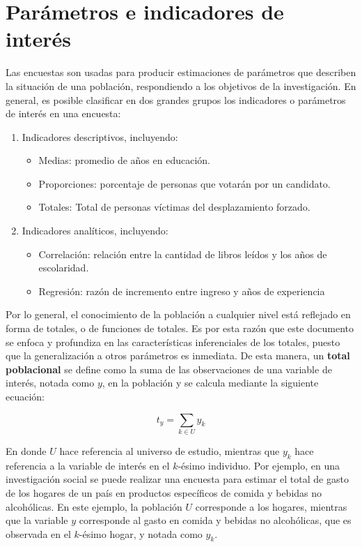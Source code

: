 \documentclass[
  12pt,
  spanish,
]{book}
\providecommand{\tightlist}{%
  \setlength{\itemsep}{0pt}\setlength{\parskip}{0pt}}
\begin{document}
\hypertarget{paruxe1metros-e-indicadores-de-interuxe9s}{%
\section{Parámetros e indicadores de interés}\label{paruxe1metros-e-indicadores-de-interuxe9s}}

Las encuestas son usadas para producir estimaciones de parámetros que describen la situación de una población, respondiendo a los objetivos de la investigación. En general, es posible clasificar en dos grandes grupos los indicadores o parámetros de interés en una encuesta:

\begin{enumerate}
\def\labelenumi{\arabic{enumi}.}
\tightlist
\item
  Indicadores descriptivos, incluyendo:

  \begin{itemize}
  \tightlist
  \item
    Medias: promedio de años en educación.
  \item
    Proporciones: porcentaje de personas que votarán por un candidato.
  \item
    Totales: Total de personas víctimas del desplazamiento forzado.
  \end{itemize}
\item
  Indicadores analíticos, incluyendo:

  \begin{itemize}
  \tightlist
  \item
    Correlación: relación entre la cantidad de libros leídos y los años de escolaridad.
  \item
    Regresión: razón de incremento entre ingreso y años de experiencia
  \end{itemize}
\end{enumerate}

Por lo general, el conocimiento de la población a cualquier nivel está reflejado en forma de totales, o de funciones de totales. Es por esta razón que este documento se enfoca y profundiza en las características inferenciales de los totales, puesto que la generalización a otros parámetros es inmediata. De esta manera, un \textbf{total poblacional} se define como la suma de las observaciones de una variable de interés, notada como \(y\), en la población y se calcula mediante la siguiente ecuación:

\[t_y = \sum_{k \in U} y_k\]

En donde \(U\) hace referencia al universo de estudio, mientras que \(y_k\) hace referencia a la variable de interés en el \(k\)-ésimo individuo. Por ejemplo, en una investigación social se puede realizar una encuesta para estimar el total de gasto de los hogares de un país en productos específicos de comida y bebidas no alcohólicas. En este ejemplo, la población \(U\) corresponde a los hogares, mientras que la variable \(y\) corresponde al gasto en comida y bebidas no alcohólicas, que es observada en el \(k\)-ésimo hogar, y notada como \(y_k\).
\end{document}
